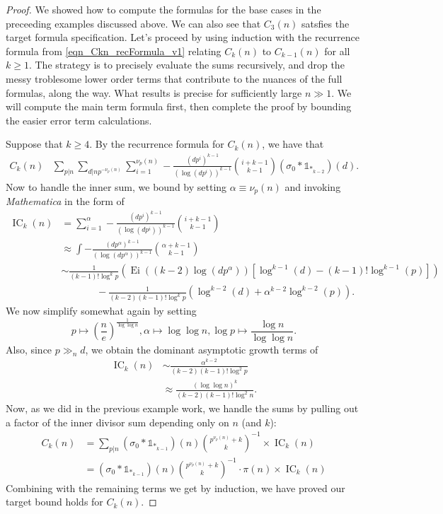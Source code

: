 \documentclass[11pt,reqno,a4letter]{article}
\numberwithin{figure}{section}
\numberwithin{table}{section}
\theoremstyle{plain}
\numberwithin{theorem}{section}
\theoremstyle{definition}
\begin{document}
\begin{proof} 
We showed how to compute the formulas for the base cases in the preceeding examples 
discussed above. We can also see that $C_3(n)$ satsfies the target formula specification. 
Let's proceed by using induction with the recurrence formula from 
\eqref{eqn_Ckn_recFormula_v1} 
relating $C_k(n)$ to $C_{k-1}(n)$ for all $k \geq 1$. The strategy is to 
precisely evaluate the sums recursively, and drop the messy troblesome lower order 
terms that contribute to the nuances of the full formulas, along the way. What results is 
precise for sufficiently large $n \gg 1$. 
We will compute the main term formula first, then complete the proof 
by bounding the easier error term calculations. 

Suppose that $k \geq 4$. By the recurrence formula for $C_k(n)$, we have that 
\begin{align*} 
C_k(n) & \sum_{p|n} \sum_{d|np^{-\nu_p(n)}} \sum_{i=1}^{\nu_p(n)} -\frac{(dp^i)^{k-1}}{(\log(dp^i))^{k-1}} 
     \binom{i+k-1}{k-1} (\sigma_0 \ast \mathds{1}_{\ast_{k-2}})(d). 
\end{align*} 
Now to handle the inner sum, we bound by setting $\alpha \equiv \nu_p(n)$ and 
invoking \emph{Mathematica} in the form of 
\begin{align*} 
\operatorname{IC}_k(n) & = \sum_{i=1}^{\alpha} -\frac{(dp^i)^{k-1}}{(\log(dp^i))^{k-1}} 
     \binom{i+k-1}{k-1} \\ 
     & \approx \int -\frac{(dp^{\alpha})^{k-1}}{(\log(dp^{\alpha}))^{k-1}} 
     \binom{\alpha+k-1}{k-1} \\ 
     & \sim \frac{1}{(k-1)! \log^k p} \left( 
     \operatorname{Ei}((k-2) \log(dp^{\alpha})) \left[
     \log^{k-1}(d) - (k-1)! \log^{k-1}(p)\right] 
     \right) \\ 
     & \phantom{\approx\qquad\ } - 
     \frac{1}{(k-2) (k-1)! \log^k p} \left( 
     \log^{k-2}(d) + \alpha^{k-2} \log^{k-2}(p) 
     \right). 
\end{align*} 
We now simplify somewhat again by setting
$$p \mapsto \left(\frac{n}{e}\right)^{\frac{1}{\log\log n}}, \alpha \mapsto \log\log n, 
  \log p \mapsto \frac{\log n}{\log\log n}.$$ 
Also, since $p \gg_{n} d$, we obtain the dominant asymptotic growth terms of 
\begin{align*} 
\operatorname{IC}_k(n) & \sim \frac{\alpha^{k-2}}{(k-2) (k-1)! \log^2 p} \\ 
     & \approx \frac{(\log\log n)^k}{(k-2) (k-1)! \log^2 n}. 
\end{align*} 
Now, as we did in the previous example work, we handle the sums by pulling out a factor of the inner 
divisor sum depending only on $n$ (and $k$): 
\begin{align*} 
C_k(n) & = \sum_{p|n} (\sigma_0 \ast \mathds{1}_{\ast_{k-1}})(n) 
     \binom{p^{\nu_p(n)} + k}{k}^{-1} \times \operatorname{IC}_k(n) \\ 
     & = (\sigma_0 \ast \mathds{1}_{\ast_{k-1}})(n) 
     \binom{p^{\nu_p(n)} + k}{k}^{-1} \cdot \pi(n) \times \operatorname{IC}_k(n)
\end{align*} 
Combining with the remaining terms we get by induction, we have proved our target bound holds 
for $C_k(n)$. 


\end{proof}
\end{document}
